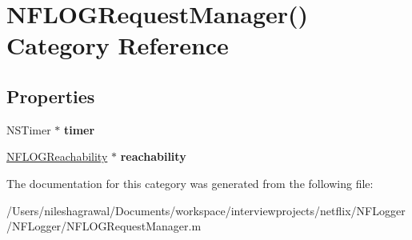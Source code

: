 \hypertarget{category_n_f_l_o_g_request_manager_07_08}{}\section{N\+F\+L\+O\+G\+Request\+Manager() Category Reference}
\label{category_n_f_l_o_g_request_manager_07_08}
\subsection*{Properties}
\begin{DoxyCompactItemize}
\item 
\mbox{\label{category_n_f_l_o_g_request_manager_07_08_a486fe35fccb754a3e9c98109860443c3}} 
N\+S\+Timer $\ast$ {\bfseries timer}
\item 
\mbox{\label{category_n_f_l_o_g_request_manager_07_08_a5e18ab6e3c1eeec2719d84c84ad304d2}} 
\hyperlink{interface_n_f_l_o_g_reachability}{N\+F\+L\+O\+G\+Reachability} $\ast$ {\bfseries reachability}
\end{DoxyCompactItemize}


The documentation for this category was generated from the following file\+:\begin{DoxyCompactItemize}
\item 
/\+Users/nileshagrawal/\+Documents/workspace/interviewprojects/netflix/\+N\+F\+Logger/\+N\+F\+Logger/N\+F\+L\+O\+G\+Request\+Manager.\+m\end{DoxyCompactItemize}
